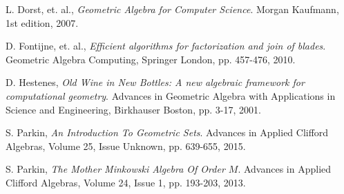 \documentclass{birkjour}
\theoremstyle{definition}
\theoremstyle{remark}
\numberwithin{equation}{section}
\begin{document}
\begin{thebibliography}{9}

L. Dorst, et. al.,
\emph{Geometric Algebra for Computer Science}.
Morgan Kaufmann, 1st edition, 2007.

D. Fontijne, et. al.,
\emph{Efficient algorithms for factorization and join of blades}.
Geometric Algebra Computing, Springer London, pp. 457-476, 2010.

D. Hestenes,
\emph{Old Wine in New Bottles: A new algebraic framework for computational geometry}.
Advances in Geometric Algebra with Applications in Science and Engineering,
Birkhauser Boston, pp. 3-17, 2001.

S. Parkin,
\emph{An Introduction To Geometric Sets}.
Advances in Applied Clifford Algebras, Volume 25, Issue Unknown, pp. 639-655, 2015.

S. Parkin,
\emph{The Mother Minkowski Algebra Of Order $M$}.
Advances in Applied Clifford Algebras, Volume 24, Issue 1, pp. 193-203, 2013.

\end{thebibliography}
\end{document}
